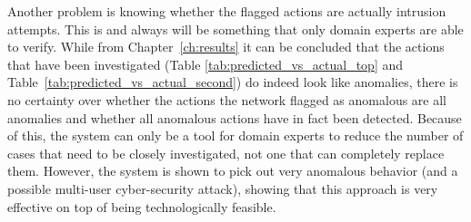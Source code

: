 Another problem is knowing whether the flagged actions are actually intrusion attempts. This is and always will be something that only domain experts are able to verify. While from Chapter~\ref{ch:results} it can be concluded that the actions that have been investigated (Table \ref{tab:predicted_vs_actual_top} and Table~\ref{tab:predicted_vs_actual_second}) do indeed look like anomalies, there is no certainty over whether the actions the network flagged as anomalous are all anomalies and whether all anomalous actions have in fact been detected. Because of this, the system can only be a tool for domain experts to reduce the number of cases that need to be closely investigated, not one that can completely replace them. However, the system is shown to pick out very anomalous behavior (and a possible multi-user cyber-security attack), showing that this approach is very effective on top of being technologically feasible.
